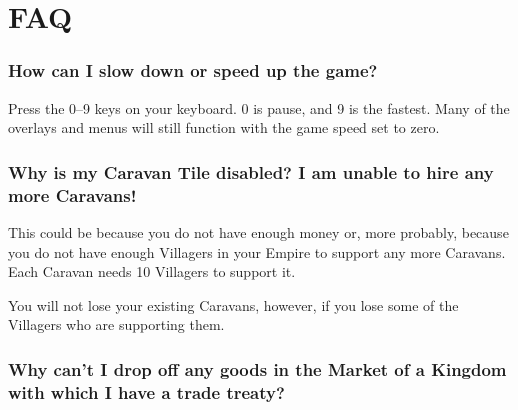 
\chapter{FAQ}



\subsection{How can I slow down or speed up the game?}

Press the 0--9 keys on your keyboard. 0 is pause, and 9 is the fastest. Many of the overlays and menus will still function with the game speed set to zero.

\subsection{Why is my Caravan Tile disabled? I am unable to hire any more Caravans!}

This could be because you do not have enough money or, more probably, because you do not have enough Villagers in your Empire to support any more Caravans. Each Caravan needs 10 Villagers to support it.

You will not lose your existing Caravans, however, if you lose some of the Villagers who are supporting them.

\subsection{Why can’t I drop off any goods in the Market of a Kingdom with which I have a trade treaty?}

